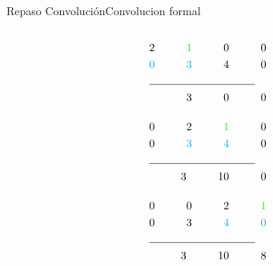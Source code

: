\begin{frame}{Repaso Convolución}{Convolucion formal}
   \begin{columns}[t]
      \begin{column}{0.4\textwidth}
      \tiny
            \begin{align*}
                                2 \hspace{1cm} \textcolor{green}{1}\hspace{1cm}0 \hspace{1cm}0\\
               \textcolor{cyan}{0}\hspace{1cm} \textcolor{cyan} {3}\hspace{1cm}4 \hspace{1cm}0\\
               \cline{1-2}
               3\hspace{1cm} 0\hspace{1cm}0\\[0.4cm]
               0\hspace{1cm}                  2 \hspace{1cm}\textcolor{green}{1} \hspace{1cm}0\\
               0\hspace{1cm} \textcolor{cyan}{3}\hspace{1cm}\textcolor{cyan} {4} \hspace{1cm}0\\
               \cline{1-2}
               3\hspace{1cm} 10\hspace{1cm}0\\[0.4cm]
               0\hspace{1cm} 0\hspace{1cm}                 2 \hspace{1cm}\textcolor{green}{1}\\
               0\hspace{1cm} 3\hspace{1cm}\textcolor{cyan}{4}\hspace{1cm}\textcolor{cyan} {0}\\
               \cline{1-2}
               3 \hspace{1cm} 10 \hspace{1cm} 8\\
            \end{align*}
      \end{column}

\end{columns}
\end{frame}
